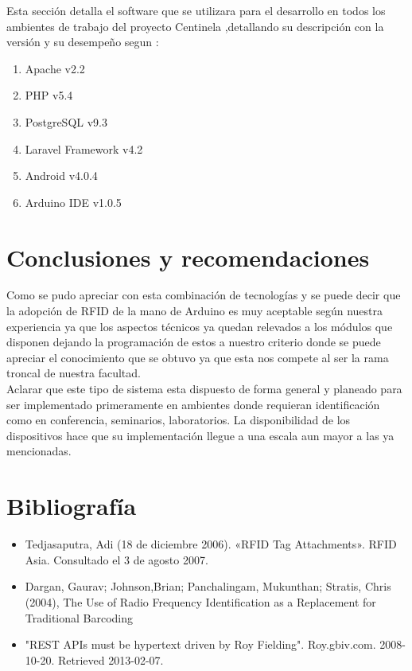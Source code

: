 \documentclass[11pt,twocolumn]{article}
\begin{document}
	Esta secci\'on detalla el software que se utilizara para el desarrollo en todos los ambientes de trabajo del proyecto Centinela ,detallando su descripci\'on con la versi\'on y su desempe\~no segun :
	
	\begin{enumerate}
		\item Apache v2.2
		\item PHP v5.4
		\item PostgreSQL v9.3
		\item Laravel Framework v4.2
		\item Android v4.0.4
		\item Arduino IDE v1.0.5
	\end{enumerate}

\section{Conclusiones y recomendaciones}
	Como se pudo apreciar con esta combinaci\'on de tecnolog\'ias y se puede decir que la adopci\'on de RFID de la mano de Arduino es muy aceptable seg\'un nuestra experiencia ya que los  aspectos t\'ecnicos ya quedan relevados a los m\'odulos que disponen dejando la programaci\'on de estos a nuestro criterio donde se puede apreciar el conocimiento que se obtuvo ya que esta nos compete al ser la rama troncal de nuestra facultad. \\
	
	Aclarar que este tipo de sistema esta dispuesto de forma general y planeado para ser implementado primeramente en ambientes donde requieran identificaci\'on como en conferencia, seminarios, laboratorios. La disponibilidad de los dispositivos hace que su implementaci\'on llegue a una escala aun mayor a las ya mencionadas.
\section{Bibliograf\'ia}
	
	\begin{itemize}
		\item  Tedjasaputra, Adi (18 de diciembre 2006). «RFID Tag Attachments». RFID Asia. Consultado el 3 de agosto 2007.
		\item Dargan, Gaurav; Johnson,Brian; Panchalingam, Mukunthan; Stratis, Chris (2004), The Use of Radio Frequency Identification as a Replacement for Traditional Barcoding
		
		\item "REST APIs must be hypertext driven by Roy Fielding". Roy.gbiv.com. 2008-10-20. Retrieved 2013-02-07.
	\end{itemize}

	
\end{document}
